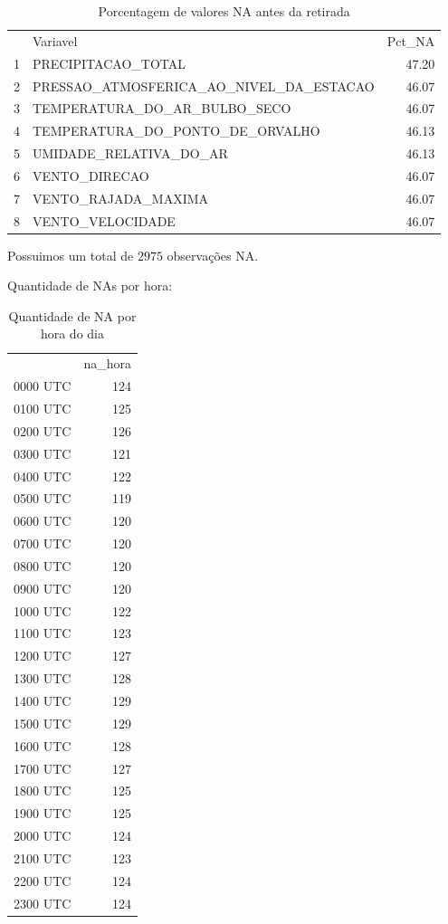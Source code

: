 \documentclass[12pt, reqno]{amsart}
\begin{document}
    \begin{table}[!ht]
    \centering
    \begin{tabular}{rlr}
    & Variavel & Pct\_NA \\ 
    1 & PRECIPITACAO\_TOTAL & 47.20 \\ 
    2 & PRESSAO\_ATMOSFERICA\_AO\_NIVEL\_DA\_ESTACAO & 46.07 \\ 
    3 & TEMPERATURA\_DO\_AR\_BULBO\_SECO & 46.07 \\ 
    4 & TEMPERATURA\_DO\_PONTO\_DE\_ORVALHO & 46.13 \\ 
    5 & UMIDADE\_RELATIVA\_DO\_AR & 46.13 \\ 
    6 & VENTO\_DIRECAO & 46.07 \\ 
    7 & VENTO\_RAJADA\_MAXIMA & 46.07 \\ 
    8 & VENTO\_VELOCIDADE & 46.07 \\ 
    \end{tabular}
    \caption{Porcentagem de valores NA antes da retirada}
    \end{table}

Possuimos um total de $2975$ observações NA.

Quantidade de NAs por hora:

\begin{table}[ht]
    \centering
    \begin{tabular}{rr}
 & na\_hora \\ 
        0000 UTC & 124 \\ 
        0100 UTC & 125 \\ 
        0200 UTC & 126 \\ 
        0300 UTC & 121 \\ 
        0400 UTC & 122 \\ 
        0500 UTC & 119 \\ 
        0600 UTC & 120 \\ 
        0700 UTC & 120 \\ 
        0800 UTC & 120 \\ 
        0900 UTC & 120 \\ 
        1000 UTC & 122 \\ 
        1100 UTC & 123 \\ 
        1200 UTC & 127 \\ 
        1300 UTC & 128 \\ 
        1400 UTC & 129 \\ 
        1500 UTC & 129 \\ 
        1600 UTC & 128 \\ 
        1700 UTC & 127 \\ 
        1800 UTC & 125 \\ 
        1900 UTC & 125 \\ 
        2000 UTC & 124 \\ 
        2100 UTC & 123 \\ 
        2200 UTC & 124 \\ 
        2300 UTC & 124 \\ 
    \end{tabular}
    \caption{Quantidade de NA por hora do dia}
\end{table}
\end{document}
